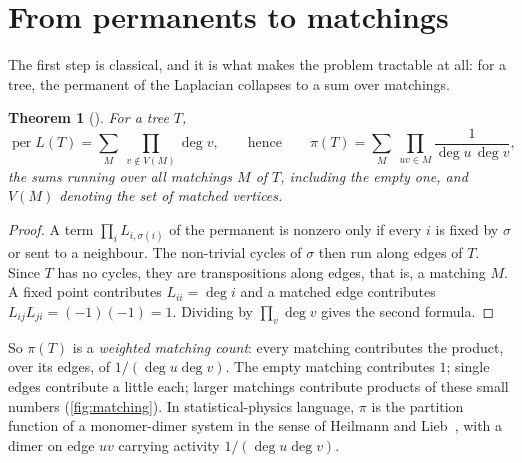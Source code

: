 \documentclass[11pt]{article}
\newtheorem{theorem}{Theorem}
\theoremstyle{definition}
\newcommand{\per}{\operatorname{per}}
\renewcommand{\deg}{\operatorname{deg}}
\begin{document}
\section{From permanents to matchings}\label{sec:matching}

The first step is classical, and it is what makes the problem tractable at all: for a tree, the
permanent of the Laplacian collapses to a sum over matchings.

\begin{theorem}[\cite{BG1984,Pant2026}]\label{thm:matchsum}
For a tree $T$,
\[
  \per L(T)=\sum_{M}\ \prod_{v\notin V(M)}\deg v,
  \qquad\text{hence}\qquad
  \pi(T)=\sum_{M}\ \prod_{uv\in M}\frac{1}{\deg u\,\deg v},
\]
the sums running over all matchings $M$ of $T$, including the empty one, and $V(M)$ denoting the set of
matched vertices.
\end{theorem}
\begin{proof}
A term $\prod_i L_{i,\sigma(i)}$ of the permanent is nonzero only if every $i$ is fixed by $\sigma$ or
sent to a neighbour. The non-trivial cycles of $\sigma$ then run along edges of $T$. Since $T$ has no
cycles, they are transpositions along edges, that is, a matching $M$. A fixed point contributes
$L_{ii}=\deg i$ and a matched edge contributes $L_{ij}L_{ji}=(-1)(-1)=1$. Dividing by $\prod_v\deg v$
gives the second formula.
\end{proof}

So $\pi(T)$ is a \emph{weighted matching count}: every matching contributes the product, over its edges,
of $1/(\deg u\deg v)$. The empty matching contributes $1$; single edges contribute a little each; larger
matchings contribute products of these small numbers (\cref{fig:matching}). In statistical-physics
language, $\pi$ is the partition function of a monomer-dimer system in the sense of Heilmann and
Lieb~\cite{HL1972}, with a dimer on edge $uv$ carrying activity $1/(\deg u\deg v)$.
\end{document}

